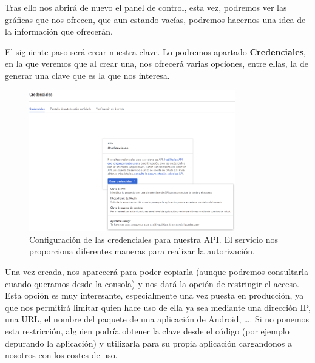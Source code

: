 Tras ello nos abrirá de nuevo el panel de control, esta vez, podremos ver las gráficas que nos ofrecen, que aun estando vacías, podremos hacernos una idea de la información que ofrecerán.

El siguiente paso será crear nuestra clave. Lo podremos apartado \textbf{Credenciales}, en la que veremos que al crear una, nos ofrecerá varias opciones, entre ellas, la de generar una clave que es la que nos interesa.

\begin{figure}[H]
\centering
  \includegraphics[width=0.8\textwidth]{Figures/anexo/google_api/api_credential}
  \caption{Configuración de las credenciales para nuestra API. El servicio nos proporciona diferentes maneras para realizar la autorización.}
\end{figure}

Una vez creada, nos aparecerá para poder copiarla (aunque podremos consultarla cuando queramos desde la consola) y nos dará la opción de restringir el acceso. Esta opción es muy interesante, especialmente una vez puesta en producción, ya que nos permitirá limitar quien hace uso de ella ya sea mediante una dirección \gls{IP}, una URL, el nombre del paquete de una aplicación de Android, \ldots. Si no ponemos esta restricción, alguien podría obtener la clave desde el código (por ejemplo depurando la aplicación) y utilizarla para su propia aplicación cargandonos a nosotros con los costes de uso.

